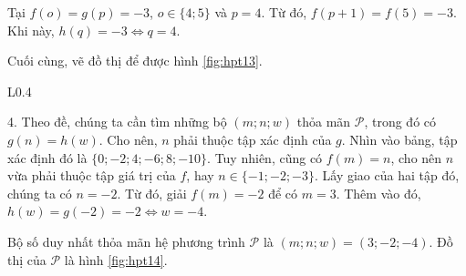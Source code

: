 Tại $f(o) = g(p) = -3$, $o \in \{4; 5\}$ và $p = 4$. Từ đó, $f(p + 1) = f(5) = -3$. Khi này, $h(q) = -3 \iff q = 4$.

Cuối cùng, vẽ đồ thị để được hình \ref{fig:hpt13}.

\begin{wrapfigure}{L}{0.4\textwidth}
   \centering
   \caption{Đồ thị phần 4 bài \ref{ex:hpt1}}
   \label{fig:hpt14}
\end{wrapfigure}

4. Theo đề, chúng ta cần tìm những bộ $(m;n;w)$ thỏa mãn $\mathcal{P}$, trong đó có $g(n) = h(w)$. Cho nên, $n$ phải thuộc tập xác định của $g$. Nhìn vào bảng, tập xác định đó là $\{0; -2; 4; -6; 8; -10\}$. Tuy nhiên, cũng có $f(m) = n$, cho nên $n$ vừa phải thuộc tập giá trị của $f$, hay $n \in \{-1; -2; -3\}$. Lấy giao của hai tập đó, chúng ta có $n = -2$. Từ đó, giải $f(m) = -2$ để có $m = 3$. Thêm vào đó, $h(w) = g(-2) = -2 \iff w = -4$.

Bộ số duy nhất thỏa mãn hệ phương trình $\mathcal{P}$ là $\left(m; n; w\right) = \left(3; -2; -4\right)$. Đồ thị của $\mathcal{P}$ là hình \ref{fig:hpt14}.